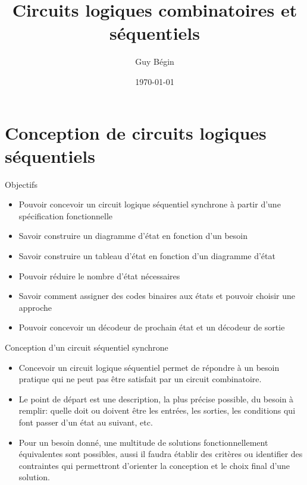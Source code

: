 \documentclass[presentation]{beamer}
\author{Guy Bégin}
\date{\today}
\title{Circuits logiques combinatoires et séquentiels}
\begin{document}
\maketitle

\section{Conception de circuits logiques séquentiels}
\label{sec:org806b9c5}
\begin{frame}[label={sec:orgaabd97c}]{Objectifs}
\begin{itemize}
\item Pouvoir concevoir un circuit logique séquentiel synchrone à partir
d'une spécification fonctionnelle
\item Savoir construire un diagramme d'état en fonction d'un besoin
\item Savoir construire un tableau d'état en fonction d'un diagramme d'état
\item Pouvoir réduire le nombre d'état nécessaires
\item Savoir comment assigner des codes binaires aux états et pouvoir
choisir une approche
\item Pouvoir concevoir un décodeur de prochain état et un décodeur de sortie
\end{itemize}
\end{frame}

\begin{frame}[label={sec:org408a323}]{Conception d'un circuit séquentiel synchrone}
\begin{itemize}
\item Concevoir un circuit logique séquentiel permet de répondre à un besoin pratique qui ne peut pas être satisfait par un circuit combinatoire.

\item Le point de départ est une description, la plus précise possible, du besoin à remplir: quelle doit ou doivent être les entrées, les sorties, les conditions qui font passer d'un état au suivant, etc.

\item Pour un besoin donné, une multitude de solutions fonctionnellement équivalentes sont possibles, aussi il faudra établir des critères ou identifier des contraintes qui permettront d'orienter la conception et le choix final d'une solution.
\end{itemize}
\end{frame}
\end{document}
